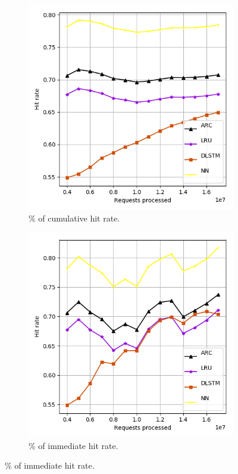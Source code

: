 \begin{figure}[b!]
	\centering
	\captionsetup{justification=centering}
	
	\begin{subfigure}[b]{0.49\linewidth}
		\includegraphics[width=\linewidth]{pics/dlstm_cum1.png}
		\caption{\% of cumulative hit rate.}
	\end{subfigure}
	\begin{subfigure}[b]{0.49\linewidth}
		\includegraphics[width=\linewidth]{pics/dlstm_i1.png}
		\caption{\% of immediate hit rate.}
	\end{subfigure}
	

\end{figure}
